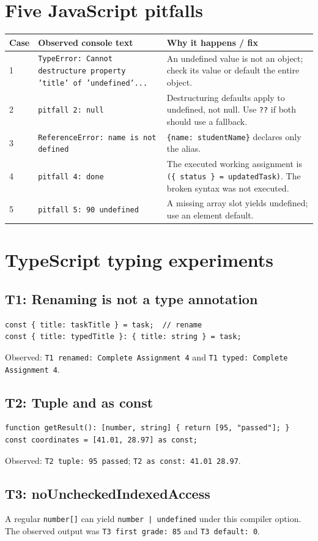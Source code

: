 \documentclass[11pt,a4paper]{article}
\begin{document}
\section{Five JavaScript pitfalls}
\begin{longtable}{@{}p{.11\linewidth}p{.36\linewidth}p{.44\linewidth}@{}}
\toprule Case & Observed console text & Why it happens / fix\\\midrule\endhead
1 & \texttt{TypeError: Cannot destructure property 'title' of 'undefined'...} & An undefined value is not an object; check its value or default the entire object.\\
2 & \texttt{pitfall 2: null} & Destructuring defaults apply to undefined, not null. Use \texttt{??} if both should use a fallback.\\
3 & \texttt{ReferenceError: name is not defined} & \texttt{\{name: studentName\}} declares only the alias.\\
4 & \texttt{pitfall 4: done} & The executed working assignment is \texttt{(\{ status \} = updatedTask)}. The broken syntax was not executed.\\
5 & \texttt{pitfall 5: 90 undefined} & A missing array slot yields undefined; use an element default.\\
\bottomrule
\end{longtable}
\section{TypeScript typing experiments}
\subsection{T1: Renaming is not a type annotation}
\begin{lstlisting}
const { title: taskTitle } = task;  // rename
const { title: typedTitle }: { title: string } = task;
\end{lstlisting}
Observed: \texttt{T1 renamed: Complete Assignment 4} and \texttt{T1 typed: Complete Assignment 4}.
\subsection{T2: Tuple and as const}
\begin{lstlisting}
function getResult(): [number, string] { return [95, "passed"]; }
const coordinates = [41.01, 28.97] as const;
\end{lstlisting}
Observed: \texttt{T2 tuple: 95 passed}; \texttt{T2 as const: 41.01 28.97}.
\subsection{T3: noUncheckedIndexedAccess}
A regular \texttt{number[]} can yield \texttt{number | undefined} under this compiler option. The observed output was \texttt{T3 first grade: 85} and \texttt{T3 default: 0}.
\end{document}
